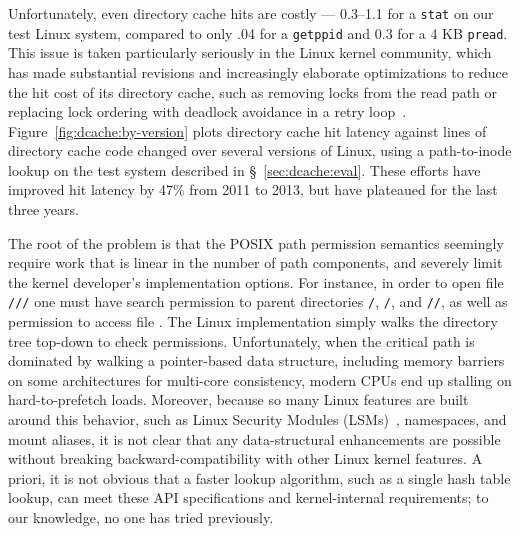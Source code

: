 Unfortunately, even directory cache hits are costly --- 0.3--1.1 \us{} for a {\tt stat} on our test Linux system, compared to only .04 \us{} for a {\tt getppid} and 0.3 \us{} for a 4 KB {\tt pread}. 
This issue is taken particularly seriously in the Linux kernel community, which has 
made substantial revisions and increasingly elaborate optimizations to reduce the hit cost
of its directory cache, such as removing locks from the read path or replacing lock ordering with deadlock avoidance in a retry loop~\citep{corbet09jls,dcache-rcu}.
Figure~\ref{fig:dcache:by-version} plots directory cache hit latency against  lines of directory cache code changed 
over several versions of Linux, using a path-to-inode lookup \microbench{} on the test system described
in \S~\ref{sec:dcache:eval}.
These efforts have improved hit latency by 47\% from 2011 to 2013, but have plateaued
for the last three years.

The root of the problem is that the POSIX path permission semantics
seemingly require work that is linear in the number of path components,
and severely limit the kernel developer's implementation options.
For instance, in order to open file {\tt /\fnone{}/\fntwo{}/\fnthree{}} 
one must have search permission
to parent directories {\tt /}, {\tt /\fnone{}}, and {\tt /\fnone{}/\fntwo{}},
as well as permission to access file {\tt \fnthree{}}.
The Linux implementation %
simply walks the directory
tree top-down to check permissions.  
Unfortunately, when the critical path is dominated by 
walking a pointer-based data structure, 
including memory barriers on some architectures for multi-core consistency, 
modern CPUs end up stalling on hard-to-prefetch loads.
Moreover, because so many Linux features are built around this behavior, such as Linux Security Modules (LSMs)~\citep{wright+lsm},
namespaces, and mount aliases, it is not clear that any data-structural enhancements
are possible without breaking backward-compatibility with other Linux kernel features.
A priori, it is not obvious that a faster lookup algorithm, such as a single hash table lookup, 
can meet these API specifications and kernel-internal requirements; to our knowledge,
no one has tried previously.

